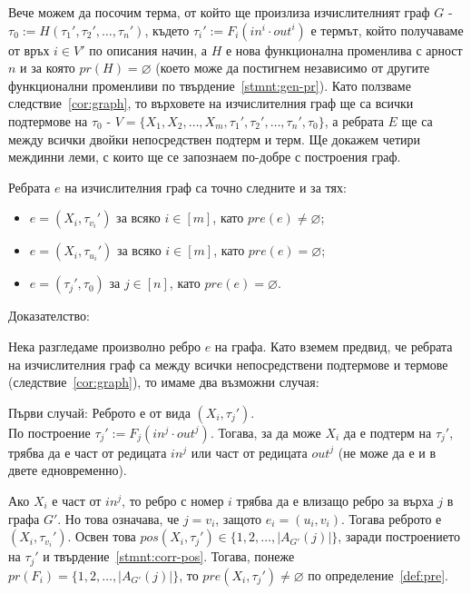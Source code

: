\documentclass[12pt,twoside,a4paper]{article}
\begin{document}
\begin{theorem}
		Вече можем да посочим терма, от който ще произлиза изчислителният граф $G$ - $\tau_0 := H(\tau_1',\tau_2',\dots,\tau_n')$, където $\tau_i' :=F_i(in^i \cdot out^i)$ е термът, който получаваме от връх $i \in V'$ по описания начин, а $H$ е нова функционална променлива с арност $n$ и за която $pr(H)=\varnothing$ (което може да постигнем независимо от другите функционални променливи по твърдение~\ref{stmnt:gen-pr}). Като ползваме следствие~\ref{cor:graph}, то върховете на изчислителния граф ще са всички подтермове на $\tau_0$ - $V=\{X_1, X_2, \dots, X_m, \tau_1', \tau_2', \dots, \tau_n', \tau_0\}$, а ребрата $E$ ще са между всички двойки непосредствен подтерм и терм. Ще докажем четири междинни леми, с които ще се запознаем по-добре с построения граф.
		
		\begin{lemma}\label{lemma:maint-1} Ребрата $e$ на изчислителния граф са точно следните и за тях:
			\begin{itemize}
				\item $e = (X_i,\tau_{v_i}')$ за всяко $i \in [m]$, като $pre(e) \neq \varnothing$;
				\item $e = (X_i,\tau_{u_i}')$ за всяко $i \in [m]$, като $pre(e) = \varnothing$;
				\item $e = (\tau_j',\tau_0)$ за $j \in [n]$, като $pre(e) = \varnothing$.
			\end{itemize}
			
			\noindent Доказателство:
			
			Нека разгледаме произволно ребро $e$ на графа. Като вземем предвид, че ребрата на изчислителния граф са между всички непосредствени подтермове и термове (следствие~\ref{cor:graph}), то имаме два възможни случая:
			
			Първи случай: Реброто е от вида $(X_i,\tau_j')$.\\
			По построение $\tau_j':=F_j(in^j \cdot out^j)$. Тогава, за да може $X_i$ да е подтерм на $\tau_j'$, трябва да е част от редицата $in^j$ или част от редицата $out^j$ (не може да е и в двете едновременно).
			
			Ако $X_i$ е част от $in^j$, то ребро с номер $i$ трябва да е влизащо ребро за върха $j$ в графа $G'$. Но това означава, че $j=v_i$, защото $e_i=(u_i,v_i)$. Тогава реброто е $(X_i,\tau_{v_i}')$. Освен това $pos(X_i,\tau_j') \in \{1, 2, \dots, |A_{G'}(j)|\}$, заради построението на $\tau_j'$ и твърдение~\ref{stmnt:corr-pos}. Тогава, понеже $pr(F_i) = \{1, 2, \dots, |A_{G'}(j)|\}$, то $pre(X_i,\tau_j') \neq \varnothing$ по определение~\ref{def:pre}.
			

\end{lemma}
\end{theorem}
\end{document}
